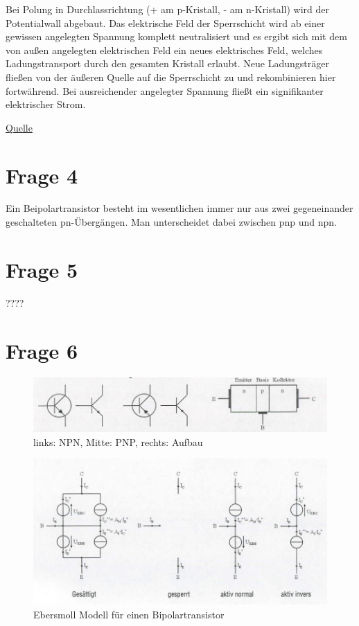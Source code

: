 Bei Polung in Durchlassrichtung (+ am p-Kristall, - am n-Kristall) wird der Potentialwall abgebaut. Das elektrische Feld der Sperrschicht wird ab einer gewissen angelegten Spannung komplett neutralisiert und es ergibt sich mit dem von außen angelegten elektrischen Feld ein neues elektrisches Feld, welches Ladungstransport durch den gesamten Kristall erlaubt. Neue Ladungsträger fließen von der äußeren Quelle auf die Sperrschicht zu und rekombinieren hier fortwährend. Bei ausreichender angelegter Spannung fließt ein signifikanter elektrischer Strom.

\href{http://de.wikipedia.org/wiki/P-n-%C3%9Cbergang}{Quelle}
	

\section{Frage 4}

Ein Beipolartransistor besteht im wesentlichen immer nur aus zwei gegeneinander geschalteten pn-Übergängen. Man unterscheidet dabei zwischen pnp und npn.


\section{Frage 5}

????

\newpage

\section{Frage 6}

\begin{figure}[h]
	\centering
	\includegraphics[scale=0.6]{Transistorschaltzeichen.jpg}	
	\caption{links: NPN, Mitte: PNP, rechts: Aufbau}
\end{figure}


\begin{figure}[h]
	\centering
	\includegraphics[scale=0.6]{Ebersmoll.jpg}	
	\caption{Ebersmoll Modell für einen Bipolartransistor}
\end{figure}


